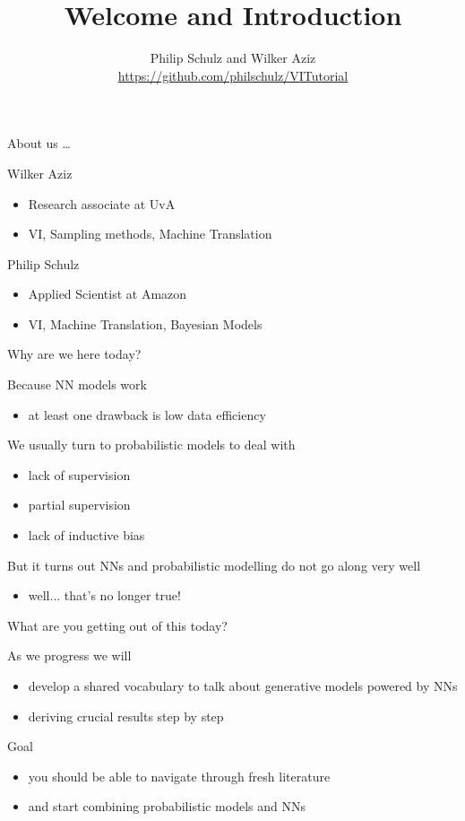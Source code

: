 \documentclass[14pt]{beamer}
\title{Welcome and Introduction}
\date{}
\author[Schulz and Aziz]{Philip Schulz and Wilker Aziz \\
\url{https://github.com/philschulz/VITutorial}}
\begin{document}
\frame{\titlepage}

\begin{frame}{About us \ldots}
\begin{block}{Wilker Aziz}
\begin{itemize}
\item Research associate at UvA
\item VI, Sampling methods, Machine Translation
\end{itemize}
\end{block}

\begin{block}{Philip Schulz}
\begin{itemize}
\item Applied Scientist at Amazon
\item VI, Machine Translation, Bayesian Models
\end{itemize}
\end{block}
\end{frame}

\begin{frame}{Why are we here today?}

Because NN models work
\begin{itemize}
	\item at least one drawback is low data efficiency
\end{itemize}
\pause

We usually turn to probabilistic models to deal with
\begin{itemize}
	\item lack of supervision
	\item partial supervision
	\item lack of inductive bias
\end{itemize}
\pause

But it turns out NNs and probabilistic modelling do not go along very well
\begin{itemize}
	\item well... \pause that's no longer true!
\end{itemize}

\end{frame}

\begin{frame}{What are you getting out of this today?}

As we progress we will
\begin{itemize}
	\item develop a shared vocabulary to talk about generative models powered by NNs
	\item deriving crucial results step by step
\end{itemize}

\pause

Goal
\begin{itemize}
	\item you should be able to navigate through fresh literature
	\item and start combining probabilistic models and NNs
\end{itemize}

\end{frame}
\end{document}
